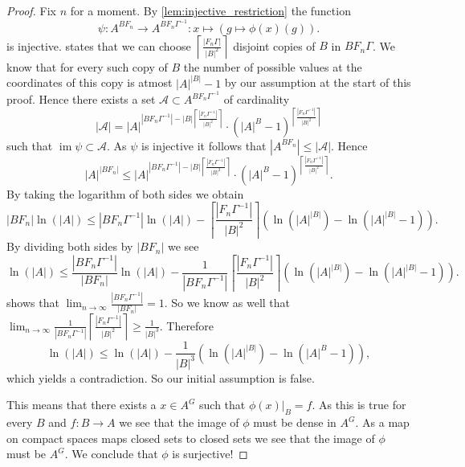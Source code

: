 \documentclass[titlepage, a4paper]{article}
\newcommand{\card}[1]{\left| #1 \right|}
\DeclareMathOperator{\im}{im}
\theoremstyle{remark}
\begin{document}
\begin{proof}
	Fix  $n$ for a moment. By \cref{lem:injective_restriction} the function \[
		\psi: A^{BF_n} \to A^{BF_n\Gamma^{-1}}: x \mapsto (g \mapsto \phi(x)(g))
	.\] 
	is injective.
	 states that we can choose  $ \left\lceil \frac{\card{F_n\Gamma}}{\card{B}^2} \right\rceil $ disjoint copies of $B$ in $BF_n\Gamma$. 
	We know that for every such copy of $B$ the number of possible values at the coordinates of this copy is atmost  $\card{A}^{\card{B}} -1$ by our assumption at the start of this proof.
	Hence there exists a set $\mathcal{A} \subset A^{BF_n\Gamma^{-1}}$ of cardinality \[
		\card{\mathcal{A}} = \card{A}^{\card{BF_n\Gamma^{-1}}- \card{B}\left\lceil \frac{\card{F_n\Gamma^{-1}}}{\card{B}^2} \right\rceil } \cdot (\card{A}^{B} -1)^{\left\lceil \frac{\card{F_n\Gamma^{-1}}}{\card{B}^2} \right\rceil }
\]
such that $\im\psi \subset \mathcal{A}$. 
As $\psi$ is injective it follows that $\card{A^{BF_n}} \le \card{\mathcal{A}}$. Hence
\[
	\card{A}^{\card{BF_n}} \le 
	\card{A}^{\card{BF_n\Gamma^{-1}}- \card{B}\left\lceil \frac{\card{F_n\Gamma^{-1}}}{\card{B}^2} \right\rceil } \cdot (\card{A}^{B} -1)^{\left\lceil \frac{\card{F_n\Gamma^{-1}}}{\card{B}^2} \right\rceil }
.\]
By taking the logarithm of both sides we obtain
\[
	\card{BF_n}\ln(\card{A}) \le \card{BF_n\Gamma^{-1}} \ln(\card{A}) - \left\lceil \frac{\card{F_n\Gamma^{-1}}}{\card{B}^2} \right\rceil \left( \ln(\card{A}^{\card{B}}) - \ln(\card{A}^{\card{B}} -1) \right)   
.\]
By dividing both sides by $\card{BF_n}$ we see 
\[
	\ln(\card{A}) \le \frac{\card{BF_n\Gamma^{-1}}}{\card{BF_n}} \ln(\card{A}) - \frac{1}{\card{BF_n\Gamma^{-1}}}\left\lceil \frac{\card{F_n\Gamma^{-1}}}{\card{B}^2} \right\rceil \left( \ln(\card{A}^{\card{B}}) - \ln(\card{A}^{\card{B}} -1) \right)   
.\]
 shows that $\lim_{n \to \infty} \frac{\card{BF_n\Gamma^{-1}}}{\card{BF_n}} = 1$. 
So we know as well that $\lim_{n \to \infty} \frac{1}{\card{BF_n\Gamma^{-1}}} \left\lceil \frac{\card{F_n\Gamma^{-1}}}{\card{B}^2} \right\rceil \ge \frac{1}{\card{B}^3} $. 
Therefore \[
	\ln(\card{A}) \le \ln(\card{A}) - \frac{1}{\card{B}^3} \left(\ln(\card{A}^{\card{B}}) - \ln(\card{A}^{B} - 1) \right)
,\]
which yields a contradiction. 
So our initial assumption is false. 

\bigskip

This means that there exists a $x \in A^{G}$ such that $\phi(x)|_B = f$. As this is true for every  $B$ and $f:B\to A$ we see that the image of  $\phi$ must be dense in $A^{G}$. As a map on compact spaces maps closed sets to closed sets we see that the image of $\phi$ must be $A^{G}$. 
We conclude that $\phi$ is surjective!


\end{proof}
\end{document}
